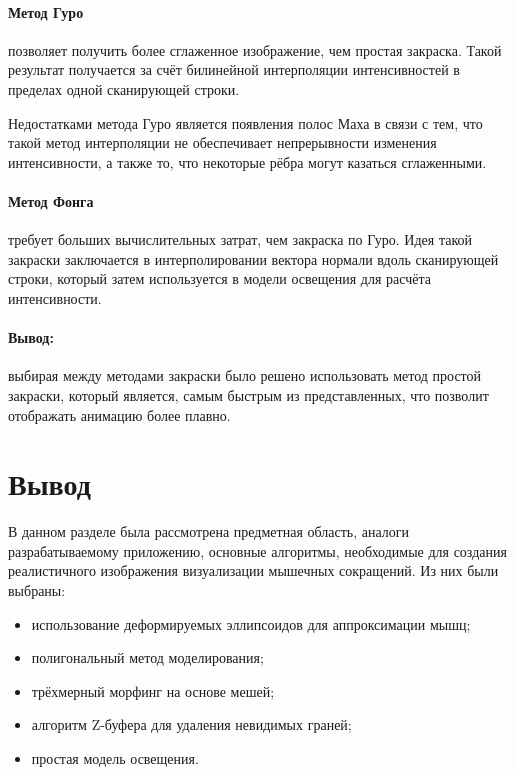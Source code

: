 \paragraph{Метод Гуро} позволяет получить более сглаженное изображение, чем простая закраска. Такой результат получается за счёт билинейной интерполяции интенсивностей в пределах одной сканирующей строки.
\par Недостатками метода Гуро является появления полос Маха в связи с тем, что такой метод интерполяции не обеспечивает непрерывности изменения интенсивности, а также то, что некоторые рёбра могут казаться сглаженными.

\paragraph{Метод Фонга} требует больших вычислительных затрат, чем закраска по Гуро. Идея такой закраски заключается в интерполировании вектора нормали вдоль сканирующей строки, который затем используется в модели освещения для расчёта интенсивности.

\paragraph{Вывод:} выбирая между методами закраски было решено использовать метод простой закраски, который является, самым быстрым из представленных, что позволит отображать анимацию более плавно.

\section{Вывод}
\label{sec:conc_analysis}
В данном разделе была рассмотрена предметная область, аналоги разрабатываемому приложению, основные алгоритмы, необходимые для создания реалистичного изображения визуализации мышечных сокращений. Из них были выбраны:
\begin{itemize}
	\item использование деформируемых эллипсоидов для аппроксимации мышц;
	\item полигональный метод моделирования;
	\item трёхмерный морфинг на основе мешей;
	\item алгоритм Z-буфера для удаления невидимых граней;
	\item простая модель освещения.
\end{itemize}